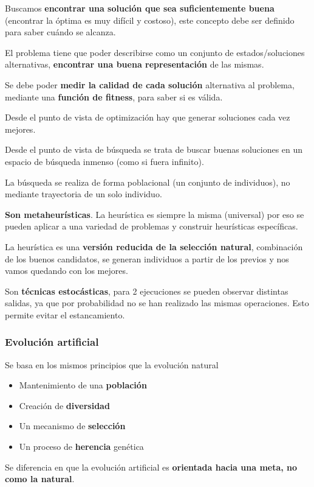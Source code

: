 \documentclass[12pt, twoside, openright]{report} %
\begin{document}
Buscamos \textbf{encontrar una solución que sea suficientemente buena} (encontrar la óptima es muy difícil y costoso), este concepto debe ser definido para saber cuándo se alcanza.

El problema tiene que poder describirse como un conjunto de estados/soluciones alternativas, \textbf{encontrar una buena representación} de las mismas.

Se debe poder \textbf{medir la calidad de cada solución} alternativa al problema, mediante una \textbf{función de fitness}, para saber si es válida.

Desde el punto de vista de optimización hay que generar soluciones cada vez mejores.

Desde el punto de vista de búsqueda se trata de buscar buenas soluciones en un espacio de búsqueda inmenso (como si fuera infinito).

La búsqueda se realiza de forma poblacional (un conjunto de individuos), no mediante trayectoria de un solo individuo.

\textbf{Son metaheurísticas}. La heurística es siempre la misma (universal) por eso se pueden aplicar a una variedad de problemas y construir heurísticas específicas.

La heurística es una \textbf{versión reducida de la selección natural}, combinación de los buenos candidatos, se generan individuos a partir de los previos y nos vamos quedando con los mejores.

Son \textbf{técnicas estocásticas}, para 2 ejecuciones se pueden observar distintas salidas, ya que por probabilidad no se han realizado las mismas operaciones. Esto permite evitar el estancamiento.
\pagebreak

\subsubsection{Evolución artificial}
Se basa en los mismos principios que la evolución natural
\begin{itemize}
	\item Mantenimiento de una \textbf{población}
	\item Creación de \textbf{diversidad}
	\item Un mecanismo de \textbf{selección}
	\item Un proceso de \textbf{herencia} genética
\end{itemize}
Se diferencia en que la evolución artificial es \textbf{orientada hacia una meta, no como la natural}.
\end{document}
